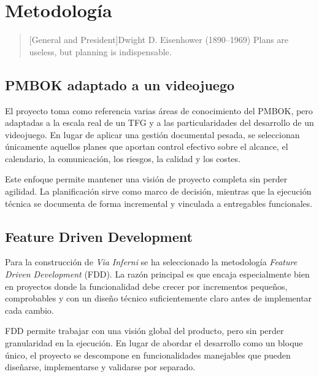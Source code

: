 \chapter{Metodología}

\begin{quotation}[General and President]{Dwight D. Eisenhower (1890--1969)}
Plans are useless, but planning is indispensable.
\end{quotation}

\begin{abstract}
En este capítulo se expone el marco metodológico que ha guiado el desarrollo de
\textit{Via Inferni}. La propuesta combina prácticas de planificación inspiradas en
PMBOK, un enfoque iterativo basado en FDD y una gestión del código orientada a mantener
trazabilidad y estabilidad durante el desarrollo.
\end{abstract}

\section{PMBOK adaptado a un videojuego}
El proyecto toma como referencia varias áreas de conocimiento del PMBOK, pero adaptadas a
la escala real de un TFG y a las particularidades del desarrollo de un videojuego. En
lugar de aplicar una gestión documental pesada, se seleccionan únicamente aquellos planes
que aportan control efectivo sobre el alcance, el calendario, la comunicación, los
riesgos, la calidad y los costes.

Este enfoque permite mantener una visión de proyecto completa sin perder agilidad. La
planificación sirve como marco de decisión, mientras que la ejecución técnica se documenta
de forma incremental y vinculada a entregables funcionales.

\section{Feature Driven Development}
Para la construcción de \textit{Via Inferni} se ha seleccionado la metodología
\textit{Feature Driven Development} (FDD). La razón principal es que encaja especialmente
bien en proyectos donde la funcionalidad debe crecer por incrementos pequeños,
comprobables y con un diseño técnico suficientemente claro antes de implementar cada
cambio.

FDD permite trabajar con una visión global del producto, pero sin perder granularidad en
la ejecución. En lugar de abordar el desarrollo como un bloque único, el proyecto se
descompone en funcionalidades manejables que pueden diseñarse, implementarse y validarse
por separado.

